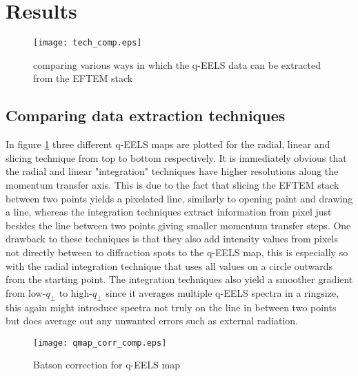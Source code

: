 \section{Results}
\label{chap:results}
\begin{figure}[h!]
	\centering
	\texttt{[image: tech\_comp.eps]}
	\caption{comparing various ways in which the q-EELS data can be extracted from the EFTEM stack}
	\label{fig:tech-comp}
\end{figure}%
%
\subsection{Comparing data extraction techniques}
In figure \ref{fig:tech-comp} three different q-EELS maps are plotted for the radial, linear and slicing technique from top to bottom respectively. It is immediately obvious that the radial and linear "integration" techniques have higher resolutions along the momentum transfer axis. This is due to the fact that slicing the EFTEM stack between two points yields a pixelated line, similarly to opening paint and drawing a line, whereas the integration techniques extract information from pixel just besides the line between two points giving smaller momentum transfer steps. One drawback to these techniques is that they also add intensity values from pixels not directly between to diffraction spots to the q-EELS map, this is especially so with the radial integration technique that uses all values on a circle outwards from the starting point.
The integration techniques also yield a smoother gradient from low-$q_{\perp}$ to high-$q_{\perp}$ since it averages multiple q-EELS spectra in a ringsize, this again might introduce spectra not truly on the line in between two points but does average out any unwanted errors such as external radiation.\\
\newpage%
%
\begin{figure}[h!]
	\centering
	\texttt{[image: qmap\_corr\_comp.eps]}
	\caption{Batson correction for q-EELS map}
	\label{fig:bat-cor}
\end{figure}
